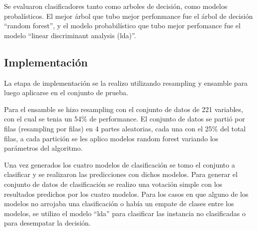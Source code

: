Se evaluaron clasificadores tanto como arboles de decisión, como modelos probalísticos. El mejor árbol
que tubo mejor perfonmance fue el árbol de decisión ``random forest'', y el modelo probabilístico
que tubo mejor perfomance fue el modelo ``linear discriminant analysis (lda)''.

\subsection{Implementación} 

La etapa de implementación se la realizo utilizando resampling y ensamble para luego
aplicarse en el conjunto de prueba. 

Para el ensamble se hizo resampling con el conjunto de datos de 221 variables,
con el cual se tenia un 54\% de performance. El conjunto de datos  se partió por filas (resampling por filas)  en 4 partes
aleatorias, cada una con el 25\% del total filas, a cada partición se les aplico modelos  random forest variando los parámetros
del algoritmo. 

Una vez generados los cuatro modelos de clasificación se tomo el conjunto a clasificar
y se realizaron las predicciones con dichos modelos. Para generar el conjunto de datos de clasificación se realizo una votación simple
con los resultados predichos por los cuatro modelos. Para los casos en que alguno de 
los modelos no arrojaba una clasificación o había un empate de clases entre los 
modelos, se utilizo  el modelo ``lda'' para clasificar las instancia no clasificadas o para desempatar la decisión.
